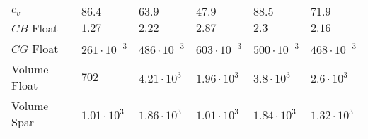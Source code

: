 \begin{tabular}{llllll}
$c_v$ & $86.4 $ & $63.9 $ & $47.9 $ & $88.5 $ & $71.9 $ \\ 
$CB$ Float & $1.27 $ & $2.22 $ & $2.87 $ & $2.3 $ & $2.16 $ \\ 
$CG$ Float & $261 \cdot 10^{-3}$ & $486 \cdot 10^{-3}$ & $603 \cdot 10^{-3}$ & $500 \cdot 10^{-3}$ & $468 \cdot 10^{-3}$ \\ 
Volume Float & $702 $ & $4.21 \cdot 10^{3}$ & $1.96 \cdot 10^{3}$ & $3.8 \cdot 10^{3}$ & $2.6 \cdot 10^{3}$ \\ 
Volume Spar & $1.01 \cdot 10^{3}$ & $1.86 \cdot 10^{3}$ & $1.01 \cdot 10^{3}$ & $1.84 \cdot 10^{3}$ & $1.32 \cdot 10^{3}$ \\ 
\end{tabular}